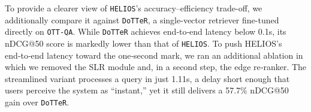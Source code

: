 {\feditcolor 
To provide a clearer view of \texttt{HELIOS}’s accuracy–efficiency trade-off, we additionally compare it against \texttt{DoTTeR}, a single-vector retriever fine-tuned directly on \texttt{OTT-QA}.
While \texttt{DoTTeR} achieves end‑to‑end latency below 0.1s, its nDCG@50 score is markedly lower than that of \texttt{HELIOS}.
To push HELIOS’s end‑to‑end latency toward the one‑second mark, we ran an additional ablation in which we removed the SLR module and, in a second step, the edge re‑ranker. 
The streamlined variant processes a query in just 1.11s, a delay short enough that users perceive the system as “instant,” yet it still delivers a 57.7\% nDCG@50 gain over \texttt{DoTTeR}.
}

